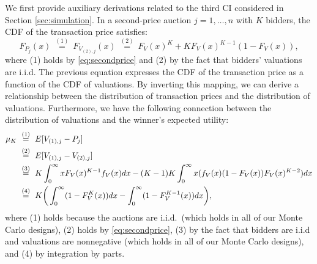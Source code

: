 We first provide auxiliary derivations related to the third CI considered in Section \ref{sec:simulation}. In a second-price auction $j=1,\ldots ,n$ with $K$ bidders, the CDF of the transaction price satisfies:
\begin{equation}
F_{P_{j}}(x)~\overset{(1)}{=}~F_{V_{(2),j}}( x) ~\overset{(2)}{=}~F_{V}(x)^{K}+KF_{V}(x)^{K-1}( 1-F_{V}( x) ) , \label{eq:functional1}
\end{equation}
where (1) holds by \eqref{eq:secondprice} and (2) by the fact that bidders' valuations are i.i.d. The previous equation expresses the CDF of the transaction price as a function of the CDF of valuations. By inverting this mapping, we can derive a relationship between the distribution of transaction prices and the distribution of valuations. Furthermore, we have the following connection between the distribution of valuations and the winner's expected utility:
\begin{align}
\mu_K &~\overset{(1)}{=}~E[ V_{( 1) ,j}-P_{j}] \notag\\
&~\overset{(2)}{=}~E[ V_{( 1) ,j}-V_{( 2) ,j}] \notag\\
&~\overset{(3)}{=}~K\int_{0}^{\infty } xF_{V}( x) ^{K-1}f_{V}( x) dx-( K-1) K\int_{0}^{\infty } x( f_{V}( x) ( 1-F_{V}( x) ) F_{V}( x) ^{K-2}) dx \nonumber \\
&~\overset{(4)}{=}~K\bigg( \int_{0}^{\infty }( 1-F_{V}^{K}(x)) dx-\int_{0}^{\infty }( 1-F_{V}^{K-1}(x)) dx\bigg) ,\notag
\end{align}
where (1) holds because the auctions are i.i.d.\ (which holds in all of our Monte Carlo designs), (2) holds by \eqref{eq:secondprice}, (3) by the fact that bidders are i.i.d and valuations are nonnegative (which holds in all of our Monte Carlo designs), and (4) by integration by parts.

